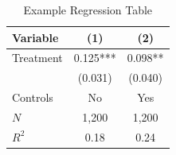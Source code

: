 \begin{table}
  \centering
  \caption{Example Regression Table}
  \begin{tabular}{lcc}
    \toprule
    Variable & (1) & (2) \\
    \midrule
    Treatment & 0.125*** & 0.098** \\
              & (0.031)  & (0.040) \\
    Controls  & No       & Yes \\
    $N$       & 1,200    & 1,200 \\
    $R^2$     & 0.18     & 0.24 \\
    \bottomrule
  \end{tabular}
\end{table}
